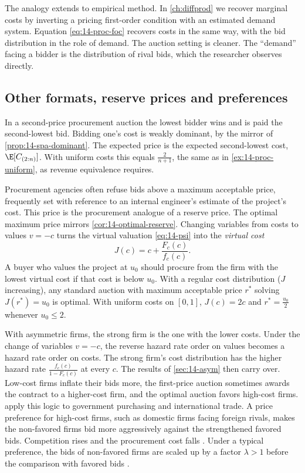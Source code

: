 The analogy extends to empirical method. In \cref{ch:diffprod} we recover marginal costs by inverting
a pricing first-order condition with an estimated demand system. Equation \eqref{eq:14-proc-foc}
recovers costs in the same way, with the bid distribution in the role of demand. The auction setting
is cleaner. The ``demand'' facing a bidder is the distribution of rival bids, which the researcher
observes directly.

\subsection{Other formats, reserve prices and preferences}\label{sec:14-proc-other}

In a second-price procurement auction the lowest bidder wins and is paid the second-lowest bid.
Bidding one's cost is weakly dominant, by the mirror of \cref{prop:14-spa-dominant}. The expected
price is the expected second-lowest cost, $\E[C_{(2:n)}]$. With uniform costs this equals
$\frac{2}{n+1}$, the same as in \cref{ex:14-proc-uniform}, as revenue equivalence requires.

Procurement agencies often refuse bids above a maximum acceptable price, frequently set with
reference to an internal engineer's estimate of the project's cost. This price is the procurement
analogue of a reserve price. The optimal maximum price mirrors \cref{cor:14-optimal-reserve}.
Changing variables from costs to values $v=-c$ turns the virtual valuation \eqref{eq:14-psi} into the
\emph{virtual cost}
\begin{equation}\label{eq:14-virtual-cost}
J(c)=c+\frac{F_c(c)}{f_c(c)} .
\end{equation}
A buyer who values the project at $u_0$ should procure from the firm with the lowest virtual cost if
that cost is below $u_0$. With a regular cost distribution ($J$ increasing), any standard auction with
maximum acceptable price $r^*$ solving $J(r^*)=u_0$ is optimal. With uniform costs on $[0,1]$,
$J(c)=2c$ and $r^*=\frac{u_0}{2}$ whenever $u_0\le 2$.

With asymmetric firms, the strong firm is the one with the lower costs. Under the change of variables
$v=-c$, the reverse hazard rate order on values becomes a hazard rate order on costs. The strong firm's
cost distribution has the higher hazard rate $\frac{f_c(c)}{1-F_c(c)}$ at every $c$. The results of
\cref{sec:14-asym} then carry over. Low-cost firms inflate their bids more, the first-price auction
sometimes awards the contract to a higher-cost firm, and the optimal auction favors high-cost firms.
\citet{McAfeeMcMillan1989} apply this logic to government purchasing and international trade. A price
preference for high-cost firms, such as domestic firms facing foreign rivals, makes the non-favored
firms bid more aggressively against the strengthened favored bids. Competition rises and the
procurement cost falls \citep[Section~3.10, p.~123]{HortacsuPerrigne2021}. Under a typical preference,
the bids of non-favored firms are scaled up by a factor $\lambda>1$ before the comparison with favored
bids \citep[p.~122]{HortacsuPerrigne2021}.

